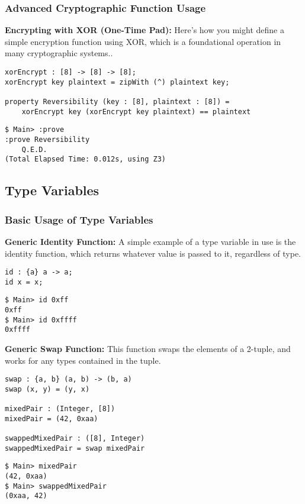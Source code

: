 \newpage
\subsubsection{Advanced Cryptographic Function Usage}
\textbf{Encrypting with XOR (One-Time Pad):} Here’s how you might define a simple encryption function using XOR, which is a foundational operation in many cryptographic systems..
\begin{lstlisting}[style=cryptol]
xorEncrypt : [8] -> [8] -> [8];
xorEncrypt key plaintext = zipWith (^) plaintext key;

property Reversibility (key : [8], plaintext : [8]) = 
	xorEncrypt key (xorEncrypt key plaintext) == plaintext
\end{lstlisting}
\begin{lstlisting}[style=zsh]
$ Main> :prove
:prove Reversibility
	Q.E.D.
(Total Elapsed Time: 0.012s, using Z3)
\end{lstlisting}

\subsection{Type Variables}

\subsubsection{Basic Usage of Type Variables}
\textbf{Generic Identity Function:} A simple example of a type variable in use is the identity function, which returns whatever value is passed to it, regardless of type.
\begin{lstlisting}[style=cryptol]
id : {a} a -> a;
id x = x;
\end{lstlisting}
\begin{lstlisting}[style=zsh]
$ Main> id 0xff
0xff
$ Main> id 0xffff
0xffff
\end{lstlisting}
\vspace{16pt}
\textbf{Generic Swap Function:} This function swaps the elements of a 2-tuple, and works for any types contained in the tuple.
\begin{lstlisting}[style=cryptol]
swap : {a, b} (a, b) -> (b, a)
swap (x, y) = (y, x)

mixedPair : (Integer, [8])
mixedPair = (42, 0xaa)

swappedMixedPair : ([8], Integer)
swappedMixedPair = swap mixedPair
\end{lstlisting}
\begin{lstlisting}[style=zsh]
$ Main> mixedPair
(42, 0xaa)
$ Main> swappedMixedPair
(0xaa, 42)
\end{lstlisting}

